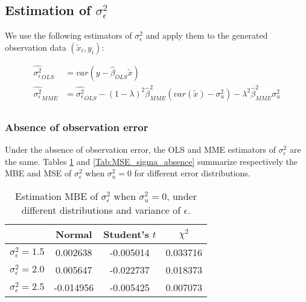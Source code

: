 \documentclass{article}
\begin{document}
\subsection{Estimation of $\sigma^2_\epsilon$}

We use the following estimators of $\sigma^2_\epsilon$ and apply them to the generated observation data $(\tilde{x}_i, y_i)$:

\begin{equation}
    \begin{split}
        \hat{\sigma^2_\epsilon}_{OLS} &= var\left(y - \hat{\beta}_{OLS} \tilde{x}\right)\\
        \hat{\sigma^2_\epsilon}_{MME} &= \hat{\sigma^2_\epsilon}_{OLS} -  (1-\lambda)^2 \hat{\beta}_{MME}^2 (var(\tilde{x}) - \sigma^2_u) - \lambda^2 \hat{\beta}_{MME}^2 \sigma^2_u\\
    \end{split}
\end{equation}

\subsubsection{Absence of observation error}

Under the absence of observation error, the OLS and MME estimators of $\sigma^2_\epsilon$ are the same. 
Tables \ref{Tab:MBE_sigma_absence} and \ref{Tab:MSE_sigma_absence} summarize respectively the MBE and MSE of $\sigma^2_\epsilon$ when $\sigma^2_u=0$ for different error distributions.

\begin{table}[ht]
    \centering
    \caption{Estimation MBE of $\sigma^2_\epsilon$ when $\sigma^2_u=0$, under different distributions and variance of $\epsilon$.}
    \label{Tab:MBE_sigma_absence}
    \begin{tabular}[t]{lccc}
        \hline
        &Normal&Student's $t$&$\chi^2$\\
        \hline
        $\sigma^2_\epsilon = 1.5$&0.002638&-0.005014&0.033716\\
        $\sigma^2_\epsilon = 2.0$&0.005647&-0.022737&0.018373\\
        $\sigma^2_\epsilon = 2.5$&-0.014956&-0.005425&0.007073\\
        \hline
    \end{tabular}
\end{table}
\end{document}
